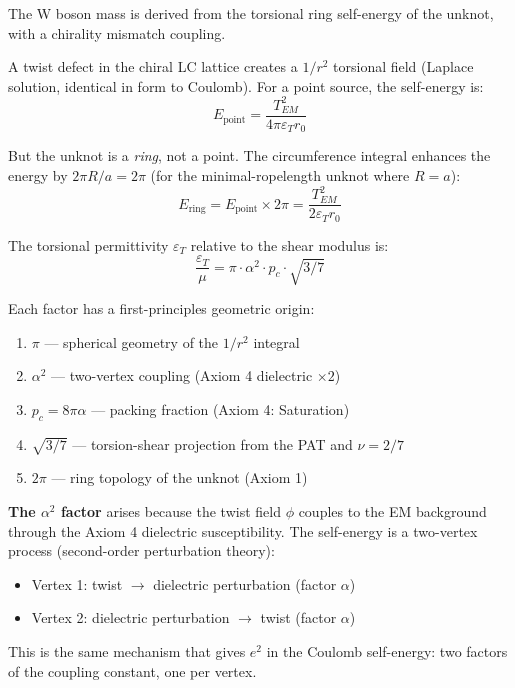 The W boson mass is derived from the torsional ring self-energy of the unknot, with a chirality mismatch coupling.

A twist defect in the chiral LC lattice creates a $1/r^2$ torsional field (Laplace solution, identical in form to Coulomb). For a point source, the self-energy is:
\begin{equation}
    E_{\text{point}} = \frac{T_{EM}^2}{4\pi \varepsilon_T r_0}
\end{equation}

But the unknot is a \textit{ring}, not a point. The circumference integral enhances the energy by $2\pi R/a = 2\pi$ (for the minimal-ropelength unknot where $R = a$):
\begin{equation}
    E_{\text{ring}} = E_{\text{point}} \times 2\pi = \frac{T_{EM}^2}{2\varepsilon_T r_0}
\end{equation}

The torsional permittivity $\varepsilon_T$ relative to the shear modulus is:
\begin{equation}
    \frac{\varepsilon_T}{\mu} = \pi \cdot \alpha^2 \cdot p_c \cdot \sqrt{3/7}
\end{equation}

Each factor has a first-principles geometric origin:
\begin{enumerate}
    \item $\pi$ --- spherical geometry of the $1/r^2$ integral
    \item $\alpha^2$ --- two-vertex coupling (Axiom 4 dielectric $\times 2$)
    \item $p_c = 8\pi\alpha$ --- packing fraction (Axiom 4: Saturation)
    \item $\sqrt{3/7}$ --- torsion-shear projection from the PAT and $\nu = 2/7$ %
    \item $2\pi$ --- ring topology of the unknot (Axiom 1)
\end{enumerate}

\textbf{The $\alpha^2$ factor} arises because the twist field $\phi$ couples to the EM background through the Axiom 4 dielectric susceptibility. The self-energy is a two-vertex process (second-order perturbation theory):
\begin{itemize}
    \item Vertex 1: twist $\to$ dielectric perturbation (factor $\alpha$)
    \item Vertex 2: dielectric perturbation $\to$ twist (factor $\alpha$)
\end{itemize}
This is the same mechanism that gives $e^2$ in the Coulomb self-energy: two factors of the coupling constant, one per vertex.

